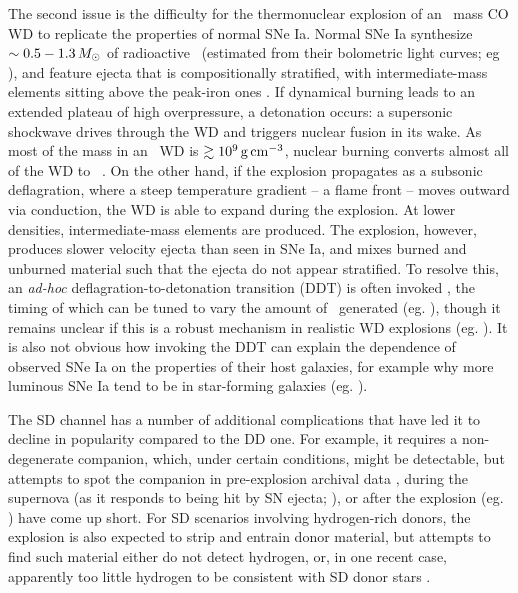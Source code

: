 The second issue is the difficulty for the thermonuclear explosion of an \Mch\ mass CO WD to replicate the properties of normal SNe Ia.  Normal SNe Ia synthesize $\sim0.5 - 1.3\,\Msun$ of radioactive \Ni\ (estimated from their bolometric light curves; eg \citealt{stri+06}), and feature ejecta that is compositionally stratified, with intermediate-mass elements sitting above the peak-iron ones \citep{howe11, hill+13}.  If dynamical burning leads to an extended plateau of high overpressure, a detonation \citep{seit+09} occurs: a supersonic shockwave drives through the WD and triggers nuclear fusion in its wake.  As most of the mass in an \Mch\ WD is $\gtrsim10^9\,\gcc$, nuclear burning converts almost all of the WD to \Ni\ \citep{howe11, hill+13}.  On the other hand, if the explosion propagates as a subsonic deflagration, where a steep temperature gradient -- a flame front -- moves outward via conduction, the WD is able to expand during the explosion.  At lower densities, intermediate-mass elements are produced.  The explosion, however, produces slower velocity ejecta than seen in SNe Ia, and mixes burned and unburned material such that the ejecta do not appear stratified.  To resolve this, an \textit{ad-hoc} deflagration-to-detonation transition (DDT) is often invoked \citep{khok91}, the timing of which can be tuned to vary the amount of \Ni\ generated (eg. \citealt{hill+13}), though it remains unclear if this is a robust mechanism in realistic WD explosions (eg. \citealt{fishj15}).  It is also not obvious how invoking the DDT can explain the dependence of observed SNe Ia on the properties of their host galaxies, for example why more luminous SNe Ia tend to be in star-forming galaxies (eg. \citealt{hamu+00, sull+10}).

The SD channel has a number of additional complications \citep{maozmn14, tsebs15} that have led it to decline in popularity compared to the DD one.  For example, it requires a non-degenerate companion, which, under certain conditions, might be detectable, but attempts to spot the companion in pre-explosion archival data \citep{li+11cpn, nielvn13, niel+14}, during the supernova (as it responds to being hit by SN ejecta; \citealt{bloo+12,ollms15}), or after the explosion (eg. \citealt{kerz+14rem}) have come up short.  For SD scenarios involving hydrogen-rich donors, the explosion is also expected to strip and entrain donor material, but attempts to find such material either do not detect hydrogen, or, in one recent case, apparently too little hydrogen to be consistent with SD donor stars \citep{magu+16}.  

